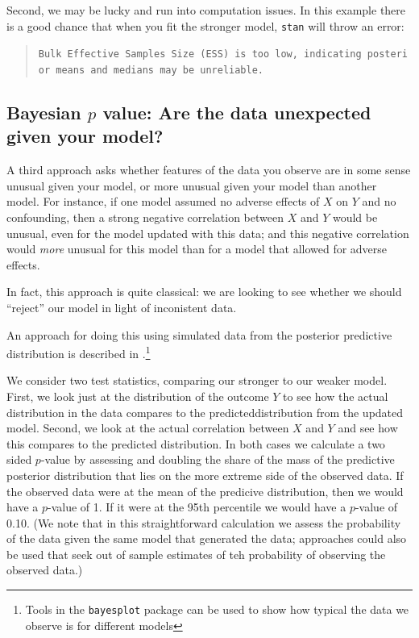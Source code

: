 \documentclass[
  12pt,
]{book}
\begin{document}
Second, we may be lucky and run into computation issues. In this example there is a good chance that when you fit the stronger model, \texttt{stan} will throw an error:

\begin{quote}
\texttt{Bulk\ Effective\ Samples\ Size\ (ESS)\ is\ too\ low,\ indicating\ posterior\ means\ and\ medians\ may\ be\ unreliable.}
\end{quote}

\hypertarget{bayesian-p-value-are-the-data-unexpected-given-your-model}{%
\subsection{\texorpdfstring{Bayesian \(p\) value: Are the data unexpected given your model?}{Bayesian p value: Are the data unexpected given your model?}}\label{bayesian-p-value-are-the-data-unexpected-given-your-model}}

A third approach asks whether features of the data you observe are in some sense unusual given your model, or more unusual given your model than another model. For instance, if one model assumed no adverse effects of \(X\) on \(Y\) and no confounding, then a strong negative correlation between \(X\) and \(Y\) would be unusual, even for the model updated with this data; and this negative correlation would \emph{more} unusual for this model than for a model that allowed for adverse effects.

In fact, this approach is quite classical: we are looking to see whether we should ``reject'' our model in light of inconistent data.

An approach for doing this using simulated data from the posterior predictive distribution is described in \citet{gabry2019visualization}.\footnote{Tools in the \texttt{bayesplot} package can be used to show how typical the data we observe is for different models}

We consider two test statistics, comparing our stronger to our weaker model. First, we look just at the distribution of the outcome \(Y\) to see how the actual distribution in the data compares to the predicteddistribution from the updated model. Second, we look at the actual correlation between \(X\) and \(Y\) and see how this compares to the predicted distribution. In both cases we calculate a two sided \(p\)-value by assessing and doubling the share of the mass of the predictive posterior distribution that lies on the more extreme side of the observed data. If the observed data were at the mean of the predicive distribution, then we would have a \(p\)-value of 1. If it were at the 95th percentile we would have a \(p\)-value of 0.10. (We note that in this straightforward calculation we assess the probability of the data given the same model that generated the data; approaches could also be used that seek out of sample estimates of teh probability of observing the observed data.)
\end{document}
